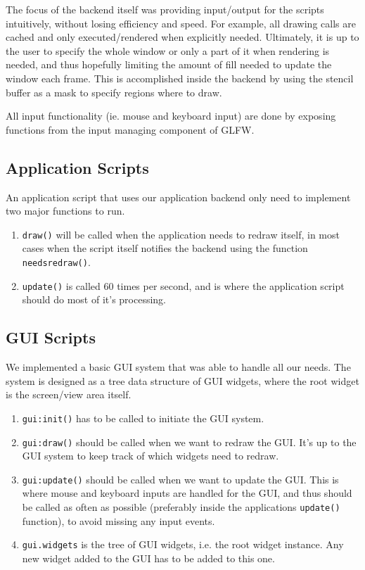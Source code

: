 The focus of the backend itself was providing input/output for the scripts intuitively, without losing efficiency and speed. For example, all drawing calls are cached and only executed/rendered when explicitly needed. Ultimately, it is up to the user to specify the whole window or only a part of it when rendering is needed, and thus hopefully limiting the amount of fill needed to update the window each frame. This is accomplished inside the backend by using the stencil buffer as a mask to specify regions where to draw.

All input functionality (ie. mouse and keyboard input) are done by exposing functions from the input managing component of GLFW.

\subsection{Application Scripts}
An application script that uses our application backend only need to implement two major functions to run.
\begin{enumerate}
  \item \texttt{draw()} will be called when the application needs to redraw itself, in most cases when the script itself notifies the backend using the function \texttt{needsredraw()}.
  \item \texttt{update()} is called 60 times per second, and is where the application script should do most of it's processing.
\end{enumerate}

\subsection{GUI Scripts}
We implemented a basic GUI system that was able to handle all our needs. The system is designed as a tree data structure of GUI widgets, where the root widget is the screen/view area itself.
\begin{enumerate}
  \item \texttt{gui:init()} has to be called to initiate the GUI system.
  \item \texttt{gui:draw()} should be called when we want to redraw the GUI. It's up to the GUI system to keep track of which widgets need to redraw.
  \item \texttt{gui:update()} should be called when we want to update the GUI. This is where mouse and keyboard inputs are handled for the GUI, and thus should be called as often as possible (preferably inside the applications \texttt{update()} function), to avoid missing any input events.
  \item \texttt{gui.widgets} is the tree of GUI widgets, i.e. the root widget instance. Any new widget added to the GUI has to be added to this one.
\end{enumerate}

